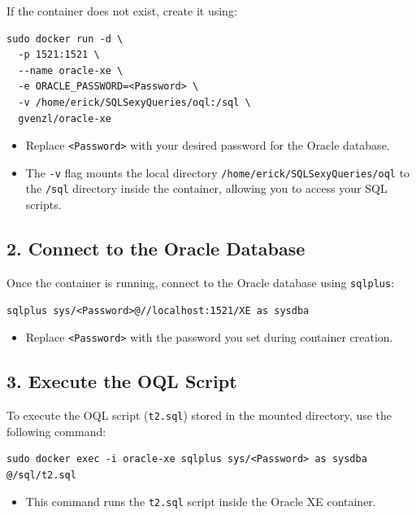 \documentclass{article}
\begin{document}
If the container does not exist, create it using:
\begin{verbatim}
sudo docker run -d \
  -p 1521:1521 \
  --name oracle-xe \
  -e ORACLE_PASSWORD=<Password> \
  -v /home/erick/SQLSexyQueries/oql:/sql \
  gvenzl/oracle-xe
\end{verbatim}
\begin{itemize}
    \item Replace \texttt{<Password>} with your desired password for the Oracle database.
    \item The \texttt{-v} flag mounts the local directory \texttt{/home/erick/SQLSexyQueries/oql} to the \texttt{/sql} directory inside the container, allowing you to access your SQL scripts.
\end{itemize}

\subsection*{2. Connect to the Oracle Database}
Once the container is running, connect to the Oracle database using \texttt{sqlplus}:
\begin{verbatim}
sqlplus sys/<Password>@//localhost:1521/XE as sysdba
\end{verbatim}
\begin{itemize}
    \item Replace \texttt{<Password>} with the password you set during container creation.
\end{itemize}

\subsection*{3. Execute the OQL Script}
To execute the OQL script (\texttt{t2.sql}) stored in the mounted directory, use the following command:
\begin{verbatim}
sudo docker exec -i oracle-xe sqlplus sys/<Password> as sysdba @/sql/t2.sql
\end{verbatim}
\begin{itemize}
    \item This command runs the \texttt{t2.sql} script inside the Oracle XE container.
\end{itemize}
\end{document}

